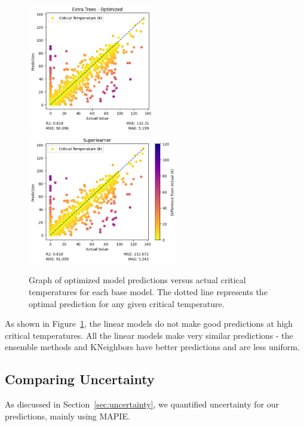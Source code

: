 \documentclass[twocolumn, nofootinbib, secnumarabic, amssymb, nobibnotes, aps, prd]{revtex4-2}
\begin{document}
\begin{figure}[!htb]
    \includegraphics[height=2.23in]{images/subfigures/no_uncertainty/extra_trees_optimized.png}
    \includegraphics[height=2.23in]{images/subfigures/no_uncertainty/superlearner.png}
    \caption{Graph of optimized model predictions versus actual critical temperatures for each base model. The dotted line represents the optimal prediction for any given critical temperature.}
    \label{fig:results}
 \end{figure}
 \twocolumngrid
\newpage

As shown in Figure~\ref{fig:results}, the linear models do not make good predictions at high critical temperatures. All the linear models make very similar predictions - the ensemble methods and KNeighbors have better predictions and are less uniform.

\subsection{Comparing Uncertainty}
As discussed in Section~\ref{sec:uncertainty}, we quantified uncertainty for our predictions, mainly using MAPIE.
\end{document}
